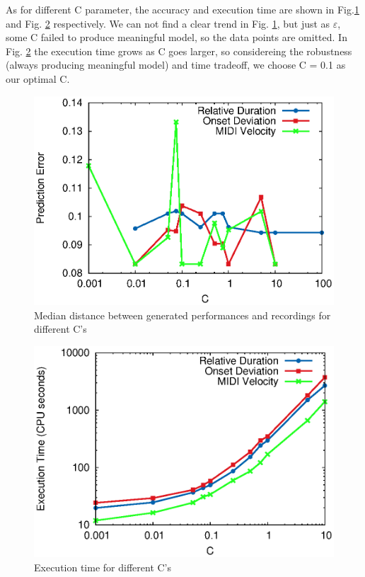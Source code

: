As for different C parameter, the accuracy and execution time are shown in Fig.\ref{fig:c_accu} and Fig. \ref{fig:c_time} respectively. We can not find a clear trend in Fig. \ref{fig:c_accu}, but just as $\varepsilon$, some C failed to produce meaningful model, so the data points are omitted. In Fig. \ref{fig:c_time} the execution time grows as C goes larger, so considereing the robustness (always producing meaningful model) and time tradeoff, we choose C = 0.1 as our optimal C.

\begin{figure}[tp]
   \begin{center}
      \includegraphics[width=\textwidth]{fig/C_accu}

   \end{center}
   \caption{Median distance between generated performances and recordings for different C's}
   \label{fig:c_accu}
\end{figure}
\begin{figure}[tp]
   \begin{center}
      \includegraphics[width=\textwidth]{fig/C_time}
   \end{center}
   \caption{Execution time for different C's}
   \label{fig:c_time}
\end{figure}
